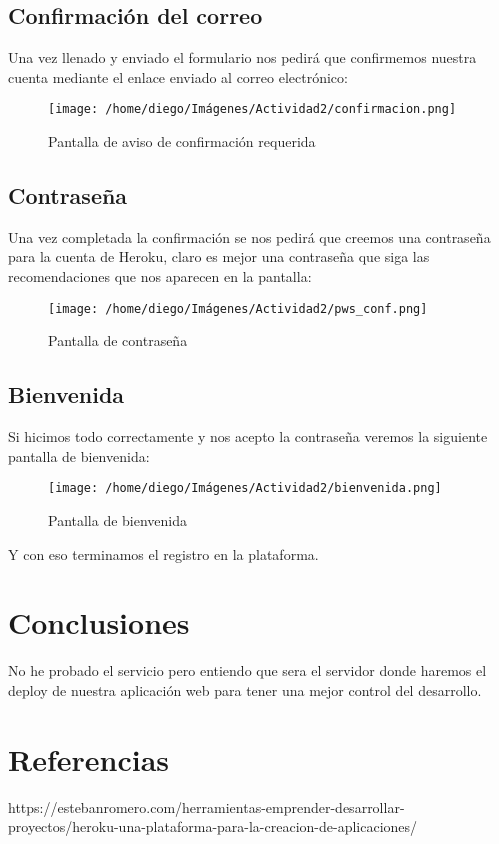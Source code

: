 \documentclass{article}
\begin{document}
		\subsection{Confirmación del correo}
		Una vez llenado y enviado el formulario nos pedirá que confirmemos nuestra cuenta mediante el enlace enviado al correo electrónico:
		\begin{figure}[h]
			\centering
			\texttt{[image: /home/diego/Imágenes/Actividad2/confirmacion.png]}
			\caption{Pantalla de aviso de confirmación requerida}
		\end{figure}
		\subsection{Contraseña}
		Una vez completada la confirmación se nos pedirá que creemos una contraseña para la cuenta de Heroku, claro es mejor una contraseña que siga las recomendaciones que nos aparecen en la pantalla:
		\begin{figure}[h]
			\centering
			\texttt{[image: /home/diego/Imágenes/Actividad2/pws\_conf.png]}
			\caption{Pantalla de contraseña}
		\end{figure}
		\newpage
		\subsection{Bienvenida}
		Si hicimos todo correctamente y nos acepto la contraseña veremos la siguiente pantalla de bienvenida:
		\begin{figure}[h]
			\centering
			\texttt{[image: /home/diego/Imágenes/Actividad2/bienvenida.png]}
			\caption{Pantalla de bienvenida}
		\end{figure}
		Y con eso terminamos el registro en la plataforma.
	\section{Conclusiones}
	No he probado el servicio pero entiendo que sera el servidor donde haremos el deploy de nuestra aplicación web para tener una mejor control del desarrollo.
	\section{Referencias}
	https://estebanromero.com/herramientas-emprender-desarrollar-proyectos/heroku-una-plataforma-para-la-creacion-de-aplicaciones/
\end{document}
